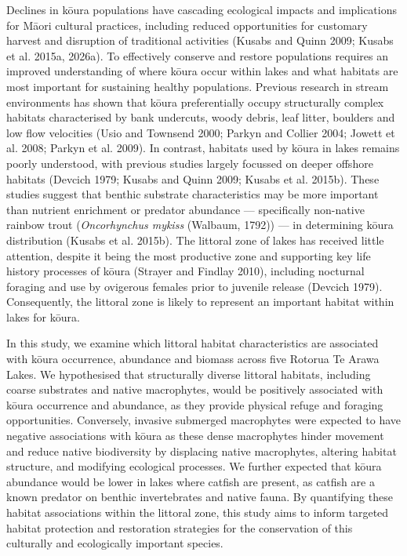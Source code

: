 \documentclass[
  12pt,
  a4paper,
  oneside]{scrbook}
\begin{document}
Declines in kōura populations have cascading ecological impacts and
implications for Māori cultural practices, including reduced
opportunities for customary harvest and disruption of traditional
activities (Kusabs and Quinn 2009; Kusabs et al. 2015a, 2026a). To
effectively conserve and restore populations requires an improved
understanding of where kōura occur within lakes and what habitats are
most important for sustaining healthy populations. Previous research in
stream environments has shown that kōura preferentially occupy
structurally complex habitats characterised by bank undercuts, woody
debris, leaf litter, boulders and low flow velocities (Usio and Townsend
2000; Parkyn and Collier 2004; Jowett et al. 2008; Parkyn et al. 2009).
In contrast, habitats used by kōura in lakes remains poorly understood,
with previous studies largely focussed on deeper offshore habitats
(Devcich 1979; Kusabs and Quinn 2009; Kusabs et al. 2015b). These
studies suggest that benthic substrate characteristics may be more
important than nutrient enrichment or predator abundance ---
specifically non-native rainbow trout (\emph{Oncorhynchus mykiss}
(Walbaum, 1792)) --- in determining kōura distribution (Kusabs et al.
2015b). The littoral zone of lakes has received little attention,
despite it being the most productive zone and supporting key life
history processes of kōura (Strayer and Findlay 2010), including
nocturnal foraging and use by ovigerous females prior to juvenile
release (Devcich 1979). Consequently, the littoral zone is likely to
represent an important habitat within lakes for kōura.

In this study, we examine which littoral habitat characteristics are
associated with kōura occurrence, abundance and biomass across five
Rotorua Te Arawa Lakes. We hypothesised that structurally diverse
littoral habitats, including coarse substrates and native macrophytes,
would be positively associated with kōura occurrence and abundance, as
they provide physical refuge and foraging opportunities. Conversely,
invasive submerged macrophytes were expected to have negative
associations with kōura as these dense macrophytes hinder movement and
reduce native biodiversity by displacing native macrophytes, altering
habitat structure, and modifying ecological processes. We further
expected that kōura abundance would be lower in lakes where catfish are
present, as catfish are a known predator on benthic invertebrates and
native fauna. By quantifying these habitat associations within the
littoral zone, this study aims to inform targeted habitat protection and
restoration strategies for the conservation of this culturally and
ecologically important species.
\end{document}
